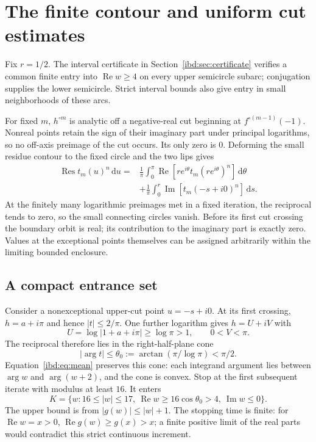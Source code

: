 \documentclass[11pt,letterpaper]{article}
\theoremstyle{remark}\newtheorem{remark}[theorem]{Remark}
\DeclareMathOperator{\Res}{Res}
\newcommand{\dd}{\,\mathrm d}
\DeclareMathOperator{\Rea}{Re}
\DeclareMathOperator{\Ima}{Im}
\begin{document}
\section{The finite contour and uniform cut estimates}\label{ibd:sec:contour}
Fix $r=1/2$. The interval certificate in Section~\ref{ibd:sec:certificate} verifies a common finite entry into $\Rea w\geq4$ on every upper semicircle subarc; conjugation supplies the lower semicircle. Strict interval bounds also give entry in small neighborhoods of these arcs.

For fixed $m$, $h^{\circ m}$ is analytic off a negative-real cut beginning at $f^{\circ(m-1)}(-1)$. Nonreal points retain the sign of their imaginary part under principal logarithms, so no off-axis preimage of the cut occurs. Its only zero is $0$. Deforming the small residue contour to the fixed circle and the two lips gives
\begin{align}\label{ibd:eq:contourfinite}
 \Res t_m(u)^n\dd u={}&\frac1\pi\int_0^\pi
 \Rea\!\left[r e^{i\theta}t_m(r e^{i\theta})^n\right]\dd\theta\\
 &+\frac1\pi\int_0^r\Ima\!\left[t_m(-s+i0)^n\right]\dd s.\nonumber
\end{align}
At the finitely many logarithmic preimages met in a fixed iteration, the reciprocal tends to zero, so the small connecting circles vanish. Before its first cut crossing the boundary orbit is real; its contribution to the imaginary part is exactly zero. Values at the exceptional points themselves can be assigned arbitrarily within the limiting bounded enclosure.

\subsection{A compact entrance set}
Consider a nonexceptional upper-cut point $u=-s+i0$. At its first crossing, $h=a+i\pi$ and hence $|t|\leq2/\pi$. One further logarithm gives $h=U+iV$ with
\[
 U=\log|1+a+i\pi|\geq\log\pi>1,\qquad0<V<\pi.
\]
The reciprocal therefore lies in the right-half-plane cone
\[
 |\arg t|\leq\theta_0:=\arctan(\pi/\log\pi)<\pi/2.
\]
Equation~\eqref{ibd:eq:mean} preserves this cone: each integrand argument lies between $\arg w$ and $\arg(w+2)$, and the cone is convex. Stop at the first subsequent iterate with modulus at least $16$. It enters
\begin{equation}\label{ibd:eq:K}
 K=\{w:16\leq|w|\leq17,\ \Rea w\geq16\cos\theta_0>4,\ \Ima w\leq0\}.
\end{equation}
The upper bound is from $|g(w)|\leq|w|+1$. The stopping time is finite: for $\Rea w=x>0$,
$\Rea g(w)\geq g(x)>x$; a finite positive limit of the real parts would contradict this strict continuous increment.
\end{document}
